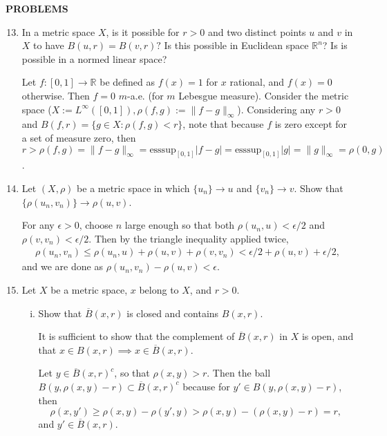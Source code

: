 \begin{center}
	\textbf{PROBLEMS}
\end{center}
\begin{enumerate}
    \setcounter{enumi}{12}
    \item In a metric space $X$, is it possible for $r>0$ and two distinct points $u$ and $v$ in $X$ to have $B(u,r)=B(v,r)?$
    Is this possible in Euclidean space $\mathbb{R}^n$?
    Is is possible in a normed linear space?

    Let $f:[0,1]\to\mathbb{R}$ be defined as $f(x)=1$ for $x$ rational, and $f(x)=0$ otherwise.
    Then $f=0$ $m$-a.e. (for $m$ Lebesgue measure).
    Consider the metric space ($X:=L^\infty([0,1]),\rho(f,g):=\|f-g\|_\infty$).
    Considering any $r>0$ and $B(f,r)=\{g\in X:\rho(f,g)<r\}$, note that because $f$ is zero except for a set of measure zero, then $r>\rho(f,g)=\|f-g\|_\infty=\text{esssup}_{[0,1]}|f-g|=\text{esssup}_{[0,1]}|g|=\|g\|_\infty=\rho(0,g)$.
    \item Let $(X,\rho)$ be a metric space in which $\{u_n\}\to u$ and $\{v_n\}\to v$.
    Show that $\{\rho(u_n,v_n)\}\to\rho(u,v)$.

    For any $\epsilon>0$, choose $n$ large enough so that both $\rho(u_n,u)<\epsilon/2$ and $\rho(v,v_n)<\epsilon/2$.
    Then by the triangle inequality applied twice, 
    \begin{align*}
        \rho(u_n,v_n)\le\rho(u_n,u)+\rho(u,v)+\rho(v,v_n)<\epsilon/2+\rho(u,v)+\epsilon/2,
    \end{align*}
    and we are done as $\rho(u_n,v_n)-\rho(u,v)<\epsilon.$
    \item Let $X$ be a metric space, $x$ belong to $X$, and $r>0$.
    \begin{enumerate}[(i)]
        \item Show that $\overline{B}(x,r)$ is closed and contains $B(x,r)$.
        
        It is sufficient to show that the complement of $\overline B(x,r)$ in $X$ is open, and that $x\in B(x,r)\implies x\in\overline{B}(x,r)$.
        
        Let $y\in \overline{B}(x,r)^c$, so that $\rho(x,y)>r$.
        Then the ball $B(y,\rho(x,y)-r)\subset \overline{B}(x,r)^c$ because for $y'\in B(y,\rho(x,y)-r)$, then 
        \[ 
            \rho(x,y')\ge\rho(x,y)-\rho(y',y)>\rho(x,y)-(\rho(x,y)-r)=r,
        \]
        and $y'\in\overline{B}(x,r)$.
        

\end{enumerate}
\end{enumerate}
